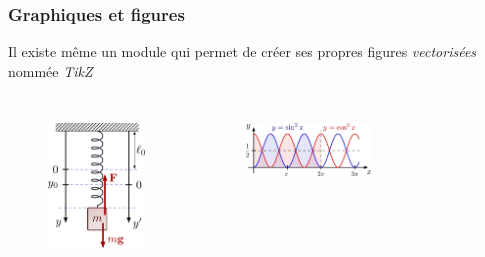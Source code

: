 \begin{frame}
    \frametitle{Graphiques et figures}
    Il existe même un module qui permet de créer ses propres figures \textit{vectorisées} nommée \textcolor{vibrant_green}{\textit{TikZ}}\footnotemark
    \vfill
    \pause
    \begin{columns}
        \begin{figure}
            \centering
            \includegraphics[width=0.55\linewidth]{./figures/tikz.png}
            \label{fig: tikz}
        \end{figure}
        \pause
        \begin{figure}
            \centering
            \includegraphics[width=0.9\linewidth]{./figures/tikz_2.png}
            \label{fig: tikz_2}
        \end{figure}
        \pause
        \begin{figure}
            \centering

\end{figure}
\end{columns}
\end{frame}
